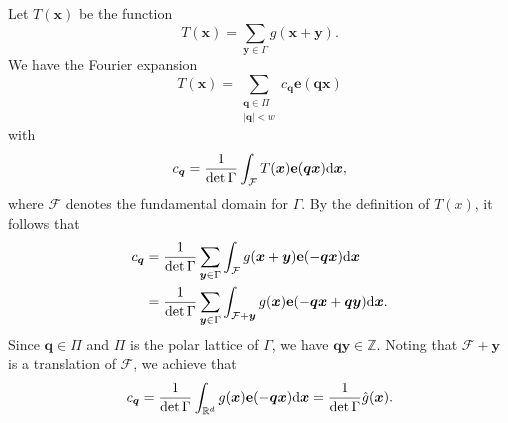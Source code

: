 \documentclass[12pt, reqno, twoside, letterpaper]{amsart}
\numberwithin{equation}{section}
\newcommand{\cF}{\ensuremath{\mathcal{F}}}
\newcommand{\RR}{\ensuremath{\mathbb{R}}}
\newcommand{\ZZ}{\ensuremath{\mathbb{Z}}}
\theoremstyle{customthm}
\theoremstyle{customrem}
\def\int{\intop\nolimits}
\begin{document}
Let $T(\boldsymbol{x})$ be the function
$$
T(\boldsymbol{x}) = \sum_{\boldsymbol{y} \in \Gamma} g(\boldsymbol{x}+\boldsymbol{y}).
$$
We have the Fourier expansion
$$
T(\boldsymbol{x}) = \sum_{\substack{\boldsymbol{q}\in\Pi \\ |\boldsymbol{q}|<w}}
c_{\boldsymbol{q}}\mathbf{e}(\boldsymbol{qx})
$$
with
$$
c_{\boldsymbol{q}}= \frac{1}{\det \Gamma} \int_{\cF} T(\boldsymbol{x})\mathbf{e}(\boldsymbol{qx})
\textup{d}\boldsymbol{x},
$$
where $\cF$ denotes the fundamental domain for $\Gamma$. By the definition of $T(x)$, it follows that
\begin{align*}
	c_{\boldsymbol{q}}
	&= \frac{1}{\det \Gamma} \sum_{\boldsymbol{y} \in \Gamma}
	\int_{\cF} g(\boldsymbol{x}+\boldsymbol{y}) \mathbf{e}(-\boldsymbol{qx})\textup{d}\boldsymbol{x} \\
	&= \frac{1}{\det \Gamma} \sum_{\boldsymbol{y} \in \Gamma} \int_{\cF + \boldsymbol{y}}
	g(\boldsymbol{x}) \mathbf{e}(-\boldsymbol{qx} + \boldsymbol{qy})\textup{d}\boldsymbol{x}.
\end{align*}
Since $\boldsymbol{q}\in\Pi$ and $\Pi$ is the polar lattice of $\Gamma$, we have $\boldsymbol{qy}\in\ZZ$. Noting that $\cF+\boldsymbol{y}$ is a translation of $\cF$, we achieve that
$$
c_{\boldsymbol{q}} = \frac{1}{\det \Gamma} \int_{\RR^d} g(\boldsymbol{x})
\mathbf{e}(-\boldsymbol{qx})\textup{d}\boldsymbol{x}
=  \frac{1}{\det \Gamma} \hat{g}(\boldsymbol{x}).
$$
\end{document}
